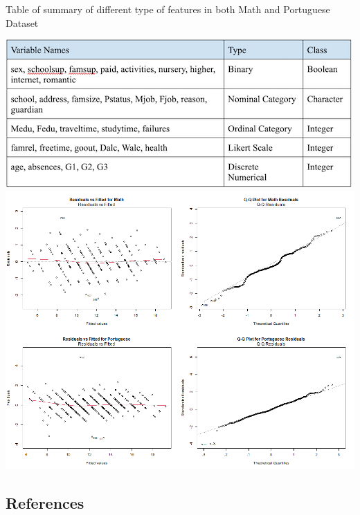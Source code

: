 \documentclass[letterpaper,9pt,twocolumn,twoside,]{pinp}
\begin{document}
Table of summary of different type of features in both Math and
Portuguese Dataset

\begin{center}\includegraphics[width=1\linewidth]{table_img} \includegraphics[width=1\linewidth]{combined_diagnostics} \end{center}

\newpage

\subsection{References}\label{references}
\end{document}
